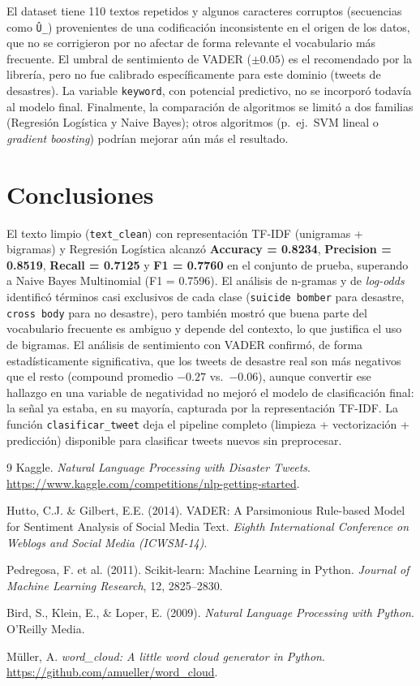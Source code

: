 \documentclass[11pt]{article}
\begin{document}
El dataset tiene 110 textos repetidos y algunos caracteres corruptos (secuencias como
\texttt{Û\_}) provenientes de una codificaci\'on inconsistente en el origen de los
datos, que no se corrigieron por no afectar de forma relevante el vocabulario m\'as
frecuente. El umbral de sentimiento de VADER ($\pm 0.05$) es el recomendado por la
librer\'ia, pero no fue calibrado espec\'ificamente para este dominio (tweets de
desastres). La variable \texttt{keyword}, con potencial predictivo, no se incorpor\'o
todav\'ia al modelo final. Finalmente, la comparaci\'on de algoritmos se limit\'o a dos
familias (Regresi\'on Log\'istica y Naive Bayes); otros algoritmos (p.\ ej.\ SVM lineal
o \emph{gradient boosting}) podr\'ian mejorar a\'un m\'as el resultado.

\section{Conclusiones}

El texto limpio (\texttt{text\_clean}) con representaci\'on TF-IDF (unigramas +
bigramas) y Regresi\'on Log\'istica alcanz\'o \textbf{Accuracy = 0.8234},
\textbf{Precision = 0.8519}, \textbf{Recall = 0.7125} y \textbf{F1 = 0.7760} en el
conjunto de prueba, superando a Naive Bayes Multinomial (F1 = 0.7596). El an\'alisis de
n-gramas y de \emph{log-odds} identific\'o t\'erminos casi exclusivos de cada clase
(\texttt{suicide bomber} para desastre, \texttt{cross body} para no desastre), pero
tambi\'en mostr\'o que buena parte del vocabulario frecuente es ambiguo y depende del
contexto, lo que justifica el uso de bigramas. El an\'alisis de sentimiento con VADER
confirm\'o, de forma estad\'isticamente significativa, que los tweets de desastre real
son m\'as negativos que el resto (compound promedio $-0.27$ vs.\ $-0.06$), aunque
convertir ese hallazgo en una variable de negatividad no mejor\'o el modelo de
clasificaci\'on final: la se\~nal ya estaba, en su mayor\'ia, capturada por la
representaci\'on TF-IDF. La funci\'on \texttt{clasificar\_tweet} deja el pipeline
completo (limpieza + vectorizaci\'on + predicci\'on) disponible para clasificar
tweets nuevos sin preprocesar.

\begin{thebibliography}{9}
Kaggle. \emph{Natural Language Processing with Disaster Tweets}. \url{https://www.kaggle.com/competitions/nlp-getting-started}.

Hutto, C.J. \& Gilbert, E.E. (2014). VADER: A Parsimonious Rule-based Model for
Sentiment Analysis of Social Media Text. \emph{Eighth International Conference on
Weblogs and Social Media (ICWSM-14)}.

Pedregosa, F. et al. (2011). Scikit-learn: Machine Learning in Python. \emph{Journal
of Machine Learning Research}, 12, 2825--2830.

Bird, S., Klein, E., \& Loper, E. (2009). \emph{Natural Language Processing with
Python}. O'Reilly Media.

M\"uller, A. \emph{word\_cloud: A little word cloud generator in Python}.
\url{https://github.com/amueller/word_cloud}.
\end{thebibliography}
\end{document}
